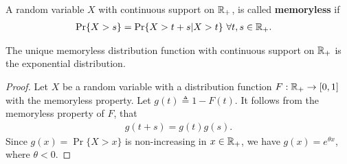 \documentclass[a4paper,10pt,english]{article}
\begin{document}
A random variable $X$ with continuous support on $\mathbb{R}_+$, is called \textbf{memoryless} if %
\begin{align*}
  \Pr\{X>s\} &= \Pr\{ X > t+s| X>t\}~\forall t,s \in \R_+.%
\end{align*}
\begin{prop} The unique memoryless distribution function with continuous support on $\mathbb{R}_+$ is the exponential distribution.
\end{prop}
\begin{proof}
Let $X$ be a random variable with a distribution function $F: \mathbb{R}_+ \to [0,1]$ with the memoryless property. 
Let $g(t) \triangleq 1 - F(t)$. It follows from the memoryless property of $F$, that
\begin{align*}
 g(t+s) = g(t)g(s).
\end{align*}
%
Since $g(x) = \Pr\{X > x\}$  is non-increasing in $x \in \mathbb{R}_+$, we have $g(x) = e^{\theta x}$, where $\theta < 0$.
\end{proof}
\end{document}
